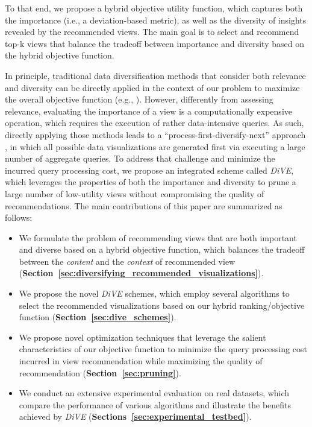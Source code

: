 To that end, we propose a hybrid objective utility function, which captures both the importance (i.e., a deviation-based metric), as well as the diversity of insights revealed by the recommended views.
%
The main goal is to select and recommend top-k views that balance the tradeoff between importance and diversity based on the hybrid objective function. 
%

In principle, traditional data diversification methods that consider both relevance and diversity can be directly applied in the context of our problem to maximize the overall objective function (e.g., \cite{Zhang2008,Rafiei2010,Yu2009}).
%
%
However, differently from assessing  relevance, evaluating the importance of a view is a computationally expensive operation, which requires the execution of rather data-intensive queries. 
%
As such, directly applying those methods leads to a ``process-first-diversify-next'' approach \cite{Khan2015}, in which all possible data visualizations are generated first via executing a large number of aggregate queries. 
%
To address that challenge and minimize the incurred query processing cost, we propose an integrated scheme called {\em DiVE}, which leverages the properties of both the importance and diversity to prune a large number of low-utility views without compromising the quality of recommendations. 
%
The main contributions of this paper are summarized as follows: 
\begin{itemize}
	\item We formulate the problem of recommending views that are both important and diverse based on a hybrid objective function, which balances the tradeoff between the {\em content} and the {\em context} of recommended view ({\bf Section~\ref{sec:diversifying_recommended_visualizations}}). 
		
	\item We propose the novel \textit{DiVE} schemes, which employ several algorithms to select the recommended visualizations based on our hybrid ranking/objective function ({\bf Section~\ref{sec:dive_schemes}}).
	
	\item We propose novel optimization techniques that leverage the salient characteristics of our objective function to minimize the query processing cost incurred in view recommendation while maximizing the quality of recommendation ({\bf Section~\ref{sec:pruning}}).
	
	\item We conduct an extensive experimental evaluation on real datasets, which compare the performance of various algorithms and illustrate the benefits achieved by \textit{DiVE} ({\bf Sections~\ref{sec:experimental_testbed}}). 
\end{itemize}
